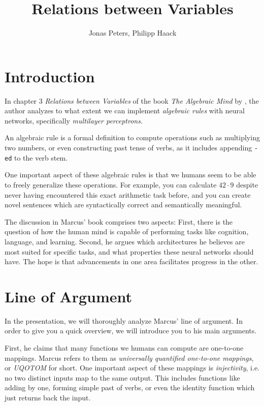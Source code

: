 \documentclass{article}
\title{Relations between Variables}
\author{Jonas Peters, Philipp Haack}
\theoremstyle{plain}
\theoremstyle{definition}
\begin{document}
\maketitle

\section*{Introduction}
In chapter 3 \emph{Relations between Variables} of the book \emph{The Algebraic Mind} by \textcite{marcus2001algebraic}, the author analyzes to what extent we can implement \emph{algebraic rules} with neural networks, specifically \emph{multilayer perceptrons}.

An algebraic rule is a formal definition to compute operations such as multiplying two numbers, or even constructing past tense of verbs, as it includes appending \texttt{-ed} to the verb stem.

One important aspect of these algebraic rules is that we humans seem to be able to freely generalize these operations. For example, you can calculate $42 \cdot 9$ despite never having encountered this exact arithmetic task before, and you can create novel sentences which are syntactically correct and semantically meaningful.

The discussion in Marcus' book comprises two aspects: First, there is the question of how the human mind is capable of performing tasks like cognition, language, and learning. Second, he argues which architectures he believes are most suited for specific tasks, and what properties these neural networks should have. The hope is that advancements in one area facilitates progress in the other.

\pagebreak
\section*{Line of Argument}
In the presentation, we will thoroughly analyze Marcus' line of argument. In order to give you a quick overview, we will introduce you to his main arguments.

First, he claims that many functions we humans can compute are one-to-one mappings. Marcus refers to them as \emph{universally quantified one-to-one mappings}, or \emph{UQOTOM} for short. One important aspect of these mappings is \emph{injectivity}, i.e. no two distinct inputs map to the same output. This includes functions like adding by one, forming simple past of verbs, or even the identity function which just returns back the input.
\end{document}
